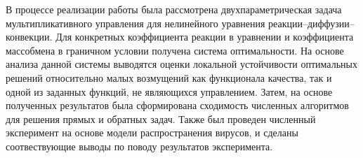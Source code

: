 В процессе реализации работы была рассмотрена двухпараметрическая задача мультипликативного управления для нелинейного уравнения реакции--диффузии--конвекции. Для конкретных коэффициента реакции в уравнении и коэффициента массобмена в граничном условии получена система оптимальности. На основе анализа данной системы выводятся оценки локальной устойчивости оптимальных решений относительно малых возмущений как функционала качества, так и одной из заданных функций, не являющихся управлением. Затем, на основе полученных результатов была сформирована сходимость численных алгоритмов для решения прямых и обратных задач. Также был проведен численный эксперимент на основе модели распространения вирусов, и сделаны соотвествующие выводы по поводу результатов эксперимента.
